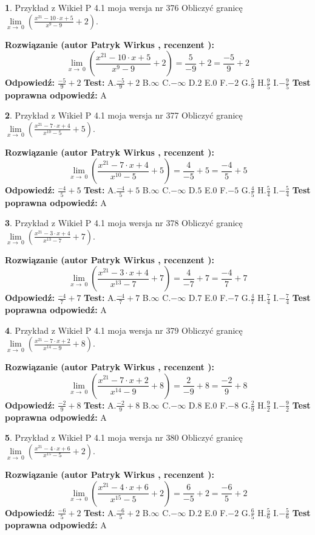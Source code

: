 \documentclass[12pt, a4paper]{article}
\theoremstyle{definition} %
\newtheorem{zad}{}
\newcommand{\zadStart}[1]{\begin{zad}#1\newline}
\newcommand{\zadStop}{\end{zad}}
\newcommand{\rozwStart}[2]{\noindent \textbf{Rozwiązanie (autor #1 , recenzent #2): }\newline}
\newcommand{\rozwStop}{\newline}
\newcommand{\odpStart}{\noindent \textbf{Odpowiedź:}\newline}
\newcommand{\odpStop}{\newline}
\newcommand{\testStart}{\noindent \textbf{Test:}\newline}
\newcommand{\testStop}{\newline}
\newcommand{\kluczStart}{\noindent \textbf{Test poprawna odpowiedź:}\newline}
\newcommand{\kluczStop}{\newline}
\begin{document}
\zadStart{Przykład z Wikieł P 4.1 moja wersja nr 376}
Obliczyć granicę $\lim\limits_{x\to\ 0}(\frac{x^{21}-10 \cdot x +5}{x^{9}-9}+2)$.
\zadStop
\rozwStart{Patryk Wirkus}{}
$$\lim\limits_{x\to\ 0}(\frac{x^{21}-10 \cdot x +5}{x^{9}-9}+2)=\frac{5}{-9}+2=\frac{-5}{9}+2$$
\rozwStop
\odpStart
$\frac{-5}{9}+2$
\odpStop
\testStart
A.$\frac{-5}{9}+2$
B.$\infty$
C.$-\infty$
D.$2$
E.$0$
F.$-2$
G.$\frac{5}{9}$
H.$\frac{9}{5}$
I.$-\frac{9}{5}$
\testStop
\kluczStart
A
\kluczStop



\zadStart{Przykład z Wikieł P 4.1 moja wersja nr 377}
Obliczyć granicę $\lim\limits_{x\to\ 0}(\frac{x^{21}-7 \cdot x +4}{x^{10}-5}+5)$.
\zadStop
\rozwStart{Patryk Wirkus}{}
$$\lim\limits_{x\to\ 0}(\frac{x^{21}-7 \cdot x +4}{x^{10}-5}+5)=\frac{4}{-5}+5=\frac{-4}{5}+5$$
\rozwStop
\odpStart
$\frac{-4}{5}+5$
\odpStop
\testStart
A.$\frac{-4}{5}+5$
B.$\infty$
C.$-\infty$
D.$5$
E.$0$
F.$-5$
G.$\frac{4}{5}$
H.$\frac{5}{4}$
I.$-\frac{5}{4}$
\testStop
\kluczStart
A
\kluczStop



\zadStart{Przykład z Wikieł P 4.1 moja wersja nr 378}
Obliczyć granicę $\lim\limits_{x\to\ 0}(\frac{x^{21}-3 \cdot x +4}{x^{13}-7}+7)$.
\zadStop
\rozwStart{Patryk Wirkus}{}
$$\lim\limits_{x\to\ 0}(\frac{x^{21}-3 \cdot x +4}{x^{13}-7}+7)=\frac{4}{-7}+7=\frac{-4}{7}+7$$
\rozwStop
\odpStart
$\frac{-4}{7}+7$
\odpStop
\testStart
A.$\frac{-4}{7}+7$
B.$\infty$
C.$-\infty$
D.$7$
E.$0$
F.$-7$
G.$\frac{4}{7}$
H.$\frac{7}{4}$
I.$-\frac{7}{4}$
\testStop
\kluczStart
A
\kluczStop



\zadStart{Przykład z Wikieł P 4.1 moja wersja nr 379}
Obliczyć granicę $\lim\limits_{x\to\ 0}(\frac{x^{21}-7 \cdot x +2}{x^{14}-9}+8)$.
\zadStop
\rozwStart{Patryk Wirkus}{}
$$\lim\limits_{x\to\ 0}(\frac{x^{21}-7 \cdot x +2}{x^{14}-9}+8)=\frac{2}{-9}+8=\frac{-2}{9}+8$$
\rozwStop
\odpStart
$\frac{-2}{9}+8$
\odpStop
\testStart
A.$\frac{-2}{9}+8$
B.$\infty$
C.$-\infty$
D.$8$
E.$0$
F.$-8$
G.$\frac{2}{9}$
H.$\frac{9}{2}$
I.$-\frac{9}{2}$
\testStop
\kluczStart
A
\kluczStop



\zadStart{Przykład z Wikieł P 4.1 moja wersja nr 380}
Obliczyć granicę $\lim\limits_{x\to\ 0}(\frac{x^{21}-4 \cdot x +6}{x^{15}-5}+2)$.
\zadStop
\rozwStart{Patryk Wirkus}{}
$$\lim\limits_{x\to\ 0}(\frac{x^{21}-4 \cdot x +6}{x^{15}-5}+2)=\frac{6}{-5}+2=\frac{-6}{5}+2$$
\rozwStop
\odpStart
$\frac{-6}{5}+2$
\odpStop
\testStart
A.$\frac{-6}{5}+2$
B.$\infty$
C.$-\infty$
D.$2$
E.$0$
F.$-2$
G.$\frac{6}{5}$
H.$\frac{5}{6}$
I.$-\frac{5}{6}$
\testStop
\kluczStart
A
\kluczStop
\end{document}

